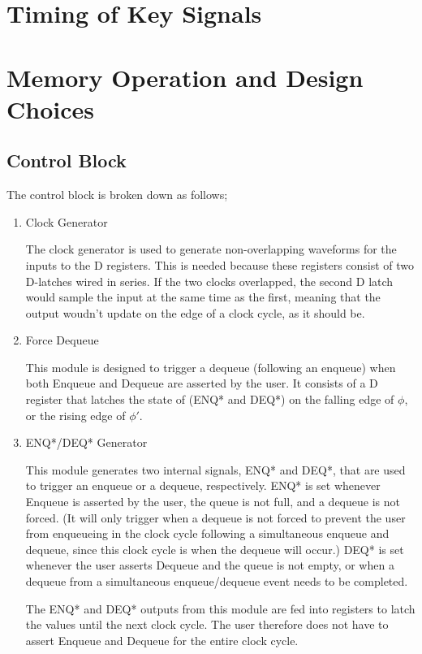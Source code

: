 \documentclass[12pt]{report}
\begin{document}
\newpage
\section*{Timing of Key Signals}

\newpage
\section*{Memory Operation and Design Choices}
\subsection*{Control Block}
The control block is broken down as follows;
\begin{enumerate}

  \item Clock Generator

  The clock generator is used to generate non-overlapping waveforms for the inputs to the D registers. This is needed because these registers consist of two D-latches wired in series. If the two clocks overlapped, the second D latch would sample the input at the same time as the first, meaning that the output woudn't update on the edge of a clock cycle, as it should be.

  \item Force Dequeue

  This module is designed to trigger a dequeue (following an enqueue) when both Enqueue and Dequeue are asserted by the user. It consists of a D register that latches the state of (ENQ* and DEQ*) on the falling edge of $\phi$, or the rising edge of $\phi'$.

  \item ENQ*/DEQ* Generator

  This module generates two internal signals, ENQ* and DEQ*, that are used to trigger an enqueue or a dequeue, respectively. ENQ* is set whenever Enqueue is asserted by the user, the queue is not full, and a dequeue is not forced. (It will only trigger when a dequeue is not forced to prevent the user from enqueueing in the clock cycle following a simultaneous enqueue and dequeue, since this clock cycle is when the dequeue will occur.) DEQ* is set whenever the user asserts Dequeue and the queue is not empty, or when a dequeue from a simultaneous enqueue/dequeue event needs to be completed.

  The ENQ* and DEQ* outputs from this module are fed into registers to latch the values until the next clock cycle. The user therefore does not have to assert Enqueue and Dequeue for the entire clock cycle.


\end{enumerate}
\end{document}
